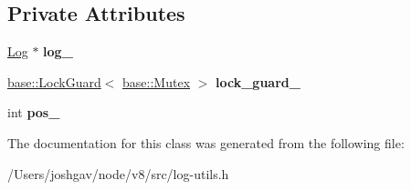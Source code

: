 \subsection*{Private Attributes}
\begin{DoxyCompactItemize}
\item 
\hyperlink{classv8_1_1internal_1_1_log}{Log} $\ast$ {\bfseries log\+\_\+}\hypertarget{classv8_1_1internal_1_1_log_1_1_b_a_s_e___e_m_b_e_d_d_e_d_ac28d9c415664087c98d9b73c2eab177d}{}\label{classv8_1_1internal_1_1_log_1_1_b_a_s_e___e_m_b_e_d_d_e_d_ac28d9c415664087c98d9b73c2eab177d}

\item 
\hyperlink{classv8_1_1base_1_1_lock_guard}{base\+::\+Lock\+Guard}$<$ \hyperlink{classv8_1_1base_1_1_mutex}{base\+::\+Mutex} $>$ {\bfseries lock\+\_\+guard\+\_\+}\hypertarget{classv8_1_1internal_1_1_log_1_1_b_a_s_e___e_m_b_e_d_d_e_d_aedac8adb101f3a44369a68cc3b9381c8}{}\label{classv8_1_1internal_1_1_log_1_1_b_a_s_e___e_m_b_e_d_d_e_d_aedac8adb101f3a44369a68cc3b9381c8}

\item 
int {\bfseries pos\+\_\+}\hypertarget{classv8_1_1internal_1_1_log_1_1_b_a_s_e___e_m_b_e_d_d_e_d_a8fb4aec25044847c562c69ccbc013c4b}{}\label{classv8_1_1internal_1_1_log_1_1_b_a_s_e___e_m_b_e_d_d_e_d_a8fb4aec25044847c562c69ccbc013c4b}

\end{DoxyCompactItemize}


The documentation for this class was generated from the following file\+:\begin{DoxyCompactItemize}
\item 
/\+Users/joshgav/node/v8/src/log-\/utils.\+h\end{DoxyCompactItemize}
